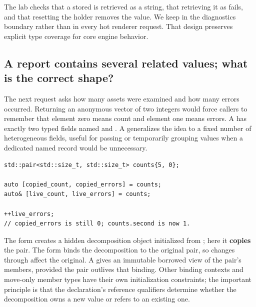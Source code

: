 The lab checks that a stored  is retrieved as a string, that retrieving it as  fails, and that resetting the holder removes the value. We keep  in the diagnostics boundary rather than in every hot renderer request. That design preserves explicit type coverage for core engine behavior.

\subsection{A report contains several related values; what is the correct shape?}\label{05-engine-i-ch006-a-report-contains-several-related-values-what-is-the-correct-shape}

\hypertarget{05-engine-i-ch006-a-report-contains-several-related-values-what-is-the-correct-shape}{}

The next request asks how many assets were examined and how many errors occurred. Returning an anonymous vector of two integers would force callers to remember that element zero means count and element one means errors. A  has exactly two typed fields named  and . A  generalizes the idea to a fixed number of heterogeneous fields, useful for passing or temporarily grouping values when a dedicated named record would be unnecessary.

\begin{verbatim}
std::pair<std::size_t, std::size_t> counts{5, 0};

auto [copied_count, copied_errors] = counts;
auto& [live_count, live_errors] = counts;

++live_errors;
// copied_errors is still 0; counts.second is now 1.
\end{verbatim}

The  form creates a hidden decomposition object initialized from ; here it \textbf{copies} the pair. The  form binds the decomposition to the original pair, so changes through  affect the original. A  gives an immutable borrowed view of the pair's members, provided the pair outlives that binding. Other binding contexts and move-only member types have their own initialization constraints; the important principle is that the declaration's reference qualifiers determine whether the decomposition owns a new value or refers to an existing one.

